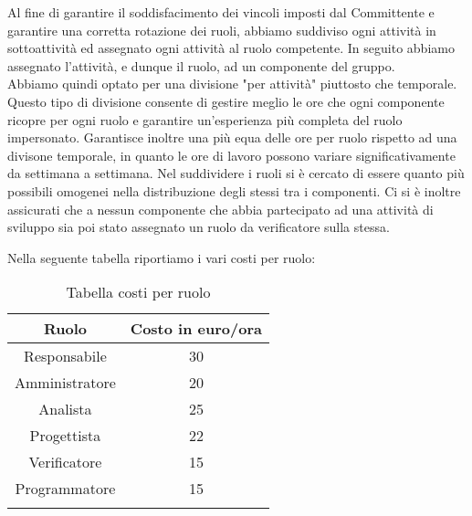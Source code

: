Al fine di garantire il soddisfacimento dei vincoli imposti dal Committente e garantire una corretta rotazione dei ruoli, abbiamo suddiviso ogni attività in sottoattività ed assegnato ogni attività al ruolo competente.
In seguito abbiamo assegnato l'attività, e dunque il ruolo, ad un componente del gruppo.\\ Abbiamo quindi optato per una divisione "per attività" piuttosto che temporale. Questo tipo di divisione consente di gestire meglio le ore che ogni componente ricopre per ogni ruolo e garantire un'esperienza più completa del ruolo impersonato. Garantisce inoltre una più equa  delle ore per ruolo rispetto ad una divisone temporale, in quanto le ore di lavoro possono variare significativamente da settimana a settimana.
Nel suddividere i ruoli si è cercato di essere quanto più possibili omogenei nella distribuzione degli stessi tra i componenti. Ci si è inoltre assicurati che a nessun componente che abbia partecipato ad una attività di sviluppo sia poi stato assegnato un ruolo da verificatore sulla stessa.


Nella seguente tabella riportiamo i vari costi per ruolo:
\begin{center}
\begin{longtable}{|c|c|}
\toprule
\textbf{Ruolo} & \textbf{Costo in euro/ora}\\
\midrule
Responsabile & 30\\
Amministratore & 20\\
Analista & 25\\
Progettista & 22\\
Verificatore & 15\\
Programmatore & 15\\
\bottomrule
\caption{Tabella costi per ruolo}
\label{tab:costiruolo}
\end{longtable}
\end{center}

